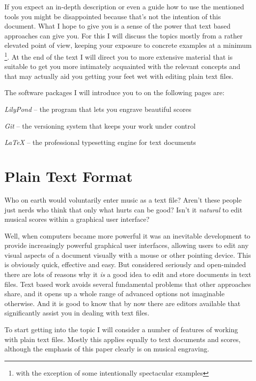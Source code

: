 \documentclass[../../LilyPond-Tutorials]{subfiles}
\begin{document}
If you expect an in-depth description or even a guide how to use the mentioned tools you might be disappointed because that's not the intention of this document.
What I hope to give you is a sense of the power that text based approaches can give you.
For this I will discuss the topics mostly from a rather elevated point of view, keeping your exposure to concrete examples at a minimum%
\footnote{with the exception of some intentionally spectacular examples}.
At the end of the text I will direct you to more extensive material that is suitable to get you more intimately acquainted with the relevant concepts and that may actually aid you getting your feet wet with editing plain text files.

The software packages I will introduce you to on the following pages are:
\begin{itemize*}
\item \emph{LilyPond} -- the program that lets you engrave beautiful scores
\item \emph{Git} -- the versioning system that keeps your work under control
\item \emph{\LaTeX} -- the professional typesetting engine for text documents
\end{itemize*}

\chapter{Plain Text Format}
\label{chap:pt_plain-text-format}
Who on earth would voluntarily enter music as a text file?
Aren't these people just nerds who think that only what hurts can be good?
Isn't it \emph{natural} to edit musical scores within a graphical user interface?

Well, when computers became more powerful it was an inevitable development to provide increasingly powerful graphical user interfaces, allowing users to edit any visual aspects of a document visually with a mouse or other pointing device.
This is obviously quick, effective and easy.
But considered seriously and open-minded there are lots of reasons why it \emph{is} a good idea to edit and store documents in text files.
Text based work avoids several fundamental problems that other approaches share, and it opens up a whole range of advanced options not imaginable otherwise.
And it is good to know that by now there are editors available that significantly assist you in dealing with text files.

To start getting into the topic I will consider a number of features of working with plain text files.
Mostly this applies equally to text documents and scores, although the emphasis of this paper clearly is on musical engraving.
\end{document}
